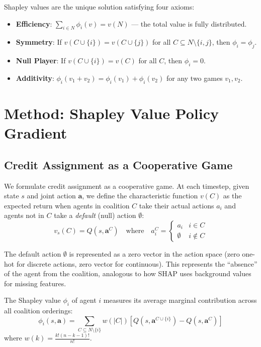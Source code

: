 \documentclass[11pt,a4paper]{article}
\begin{document}
Shapley values are the unique solution satisfying four axioms:
\begin{itemize}[leftmargin=*]
    \item \textbf{Efficiency}: $\sum_{i \in N} \phi_i(v) = v(N)$ --- the total value is fully distributed.
    \item \textbf{Symmetry}: If $v(C \cup \{i\}) = v(C \cup \{j\})$ for all $C \subseteq N \setminus \{i,j\}$, then $\phi_i = \phi_j$.
    \item \textbf{Null Player}: If $v(C \cup \{i\}) = v(C)$ for all $C$, then $\phi_i = 0$.
    \item \textbf{Additivity}: $\phi_i(v_1 + v_2) = \phi_i(v_1) + \phi_i(v_2)$ for any two games $v_1, v_2$.
\end{itemize}

\section{Method: Shapley Value Policy Gradient}

\subsection{Credit Assignment as a Cooperative Game}

We formulate credit assignment as a cooperative game. At each timestep, given state $s$ and joint action $\mathbf{a}$, we define the characteristic function $v(C)$ as the expected return when agents in coalition $C$ take their actual actions $a_i$ and agents not in $C$ take a \emph{default} (null) action $\emptyset$:
\begin{equation}
v_s(C) = Q(s, \mathbf{a}^C) \quad \text{where} \quad a^C_i = \begin{cases} a_i & i \in C \\ \emptyset & i \notin C \end{cases}
\end{equation}

The default action $\emptyset$ is represented as a zero vector in the action space (zero one-hot for discrete actions, zero vector for continuous). This represents the ``absence'' of the agent from the coalition, analogous to how SHAP \cite{lundberg2017shap} uses background values for missing features.

The Shapley value $\phi_i$ of agent $i$ measures its average marginal contribution across all coalition orderings:
\begin{equation}
\phi_i(s, \mathbf{a}) = \sum_{C \subseteq N \setminus \{i\}} w(|C|) \left[ Q(s, \mathbf{a}^{C \cup \{i\}}) - Q(s, \mathbf{a}^{C}) \right]
\label{eq:shapley_def}
\end{equation}
where $w(k) = \frac{k!(n-k-1)!}{n!}$.
\end{document}
